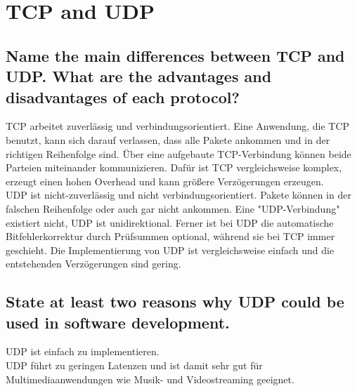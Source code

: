 \documentclass[a4paper,
			llpt,
			solution,
			accentcolor=tud2d,
			colorbacktitle
			]
			{tudexercise}
\begin{document}
\section{TCP and UDP}
\subsection{Name the main differences between TCP and UDP. What are the advantages and disadvantages of each protocol?}
TCP arbeitet zuverlässig und verbindungsorientiert. Eine Anwendung, die TCP benutzt, kann sich darauf verlassen, dass alle Pakete ankommen und in der richtigen Reihenfolge sind. Über eine aufgebaute TCP-Verbindung können beide Parteien miteinander kommunizieren. Dafür ist TCP vergleichsweise komplex, erzeugt einen hohen Overhead und kann größere Verzögerungen erzeugen. \\
UDP ist nicht-zuverlässig und nicht verbindungsorientiert. Pakete können in der falschen Reihenfolge oder auch gar nicht ankommen. Eine "UDP-Verbindung" existiert nicht, UDP ist unidirektional. Ferner ist bei UDP die automatische Bitfehlerkorrektur durch Prüfsummen optional, während sie bei TCP immer geschieht. Die Implementierung von UDP ist vergleichsweise einfach und die entstehenden Verzögerungen sind gering.
\subsection{State at least two reasons why UDP could be used in software development.}
UDP ist einfach zu implementieren.\\
UDP führt zu geringen Latenzen und ist damit sehr gut für Multimediaanwendungen wie Musik- und Videostreaming geeignet.
\end{document}
